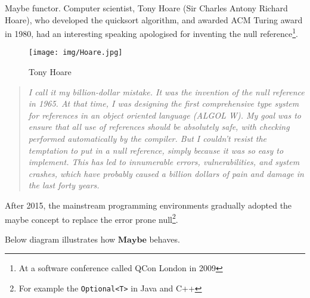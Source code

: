 \documentclass{article}
\begin{document}
\begin{example}
\normalfont
{}
Maybe functor. Computer scientist, Tony Hoare (Sir Charles Antony Richard Hoare), who developed the quicksort algorithm, and awarded ACM Turing award in 1980, had an interesting speaking apologised for inventing the null reference\footnote{At a software conference called QCon London in 2009}.

\begin{figure}[htbp]
 \centering
 \texttt{[image: img/Hoare.jpg]}
 \captionsetup{labelformat=empty}
 \caption{Tony Hoare}
 \label{fig:Hoare}
\end{figure}

\begin{quotation}
\itshape
I call it my billion-dollar mistake. It was the invention of the null reference in 1965. At that time, I was designing the first comprehensive type system for references in an object oriented language (ALGOL W). My goal was to ensure that all use of references should be absolutely safe, with checking performed automatically by the compiler. But I couldn't resist the temptation to put in a null reference, simply because it was so easy to implement. This has led to innumerable errors, vulnerabilities, and system crashes, which have probably caused a billion dollars of pain and damage in the last forty years\cite{Wiki-Hoare}.
\end{quotation}

After 2015, the mainstream programming environments gradually adopted the maybe concept to replace the error prone null\footnote{For example the \texttt{Optional<T>} in Java and C++}.

Below diagram illustrates how $\mathbf{Maybe}$ behaves.

\begin{center}
\end{center}


\end{example}
\end{document}
